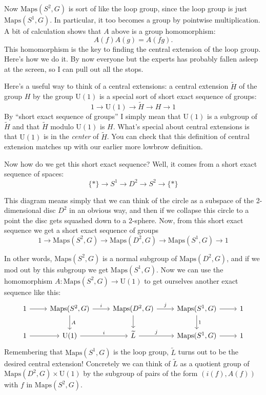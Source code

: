 \documentclass{article}
\begin{document}
Now \(\mathrm{Maps}(S^2,G)\) is sort of like the loop group, since the
loop group is just \(\mathrm{Maps}(S^1,G)\). In particular, it too
becomes a group by pointwise multiplication. A bit of calculation shows
that \(A\) above is a group homomorphism: \[A(f) A(g) = A(fg).\] This
homomorphism is the key to finding the central extension of the loop
group. Here's how we do it. By now everyone but the experts has probably
fallen asleep at the screen, so I can pull out all the stops.

Here's a useful way to think of a central extensions: a central
extension \(\widetilde{H}\) of the group \(H\) by the group
\(\mathrm{U}(1)\) is a special sort of short exact sequence of groups:
\[1 \to \mathrm{U}(1) \to \widetilde{H} \to H \to 1\] By ``short exact
sequence of groups'' I simply mean that \(\mathrm{U}(1)\) is a subgroup
of \(\widetilde{H}\) and that \(\widetilde{H}\) modulo \(\mathrm{U}(1)\)
is \(H\). What's special about central extensions is that
\(\mathrm{U}(1)\) is in the \emph{center} of \(\widetilde{H}\). You can
check that this definition of central extension matches up with our
earlier more lowbrow definition.

Now how do we get this short exact sequence? Well, it comes from a short
exact sequence of spaces: \[\{*\} \to S^1 \to D^2 \to S^2 \to \{*\}\]

This diagram means simply that we can think of the circle as a subspace
of the 2-dimensional disc \(D^2\) in an obvious way, and then if we
collapse this circle to a point the disc gets squashed down to a
2-sphere. Now, from this short exact sequence we get a short exact
sequence of groups
\[1 \to \mathrm{Maps}(S^2,G) \to \mathrm{Maps}(D^2,G) \to \mathrm{Maps}(S^1,G) \to 1\]

In other words, \(\mathrm{Maps}(S^2,G)\) is a normal subgroup of
\(\mathrm{Maps}(D^2,G)\), and if we mod out by this subgroup we get
\(\mathrm{Maps}(S^1,G)\). Now we can use the homomorphism
\(A\colon\mathrm{Maps}(S^2,G)\to \mathrm{U}(1)\) to get ourselves
another exact sequence like this: \[
  \begin{tikzcd}
    1 \rar
    & \mathrm{Maps}(S^2,G)
      \rar["i"] \dar["A"]
    & \mathrm{Maps}(D^2,G)
      \rar["j"] \dar
    & \mathrm{Maps}(S^1,G)
      \rar \dar["1"]
    & 1
  \\1 \rar
    & \mathrm{U}(1)
      \rar["i"]
    & \widetilde{L}
      \rar["j"]
    & \mathrm{Maps}(S^1,G)
      \rar
    & 1
  \end{tikzcd}
\] Remembering that \(\mathrm{Maps}(S^1,G)\) is the loop group,
\(\widetilde{L}\) turns out to be the desired central extension!
Concretely we can think of \(\widetilde{L}\) as a quotient group of
\(\mathrm{Maps}(D^2,G)\times \mathrm{U}(1)\) by the subgroup of pairs of
the form \((i(f),A(f))\) with \(f\) in \(\mathrm{Maps}(S^2,G)\).
\end{document}
